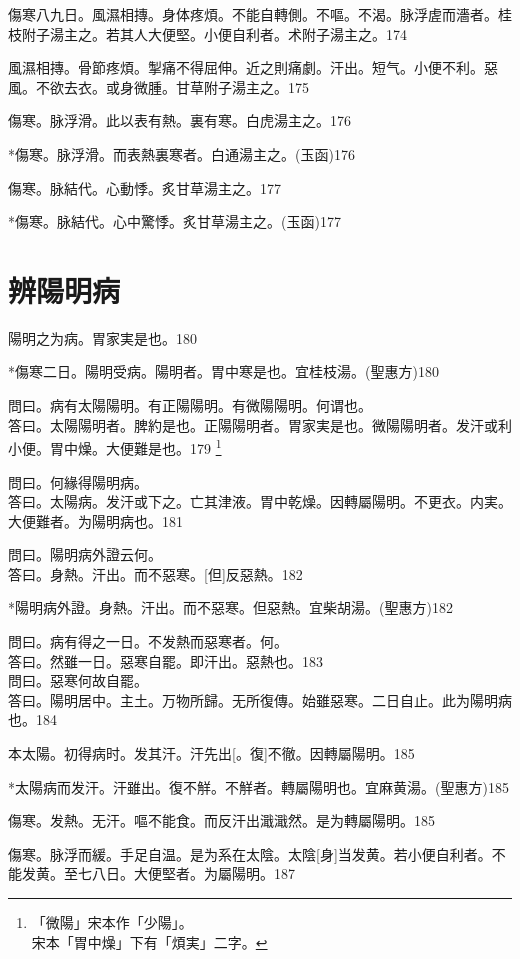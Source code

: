 \documentclass[12pt,twoside,UTF8,b5paper]{ctexbook}
\begin{document}
傷寒八九日。風濕相摶。身体疼煩。不能自轉側。不嘔。不渴。脉浮虗而濇者。桂枝附子湯主之。若其人大便堅。小便自利者。术附子湯主之。174

風濕相摶。骨節疼煩。掣痛不得屈伸。近之則痛劇。汗出。短气。小便不利。惡風。不欲去衣。或身微腫。甘草附子湯主之。175

傷寒。脉浮滑。此以表有熱。裏有寒。白虎湯主之。176

*傷寒。脉浮滑。而表熱裏寒者。白通湯主之。(玉函)176

傷寒。脉結代。心動悸。炙甘草湯主之。177

*傷寒。脉結代。心中驚悸。炙甘草湯主之。(玉函)177

\chapter{辨陽明病}

陽明之为病。胃家実是也。180

*傷寒二日。陽明受病。陽明者。胃中寒是也。宜桂枝湯。(聖惠方)180

問曰。病有太陽陽明。有正陽陽明。有微陽陽明。何谓也。\\
答曰。太陽陽明者。脾約是也。正陽陽明者。胃家実是也。微陽陽明者。发汗或利小便。胃中燥。大便難是也。179
	\footnote{「微陽」宋本作「少陽」。\\宋本「胃中燥」下有「煩実」二字。}

問曰。何緣得陽明病。\\
答曰。太陽病。发汗或下之。亡其津液。胃中乾燥。因轉屬陽明。不更衣。内実。大便難者。为陽明病也。181

問曰。陽明病外證云何。\\
答曰。身熱。汗出。而不惡寒。[但]反惡熱。182

*陽明病外證。身熱。汗出。而不惡寒。但惡熱。宜柴胡湯。(聖惠方)182

問曰。病有得之一日。不发熱而惡寒者。何。\\
答曰。然雖一日。惡寒自罷。即汗出。惡熱也。183\\
問曰。惡寒何故自罷。\\
答曰。陽明居中。主土。万物所歸。无所復傳。始雖惡寒。二日自止。此为陽明病也。184

本太陽。初得病时。发其汗。汗先出[。復]不徹。因轉屬陽明。185

*太陽病而发汗。汗雖出。復不觧。不觧者。轉屬陽明也。宜麻黄湯。(聖惠方)185

傷寒。发熱。无汗。嘔不能食。而反汗出濈濈然。是为轉屬陽明。185

傷寒。脉浮而緩。手足自温。是为系在太陰。太陰[身]当发黄。若小便自利者。不能发黄。至七八日。大便堅者。为屬陽明。187
\end{document}
